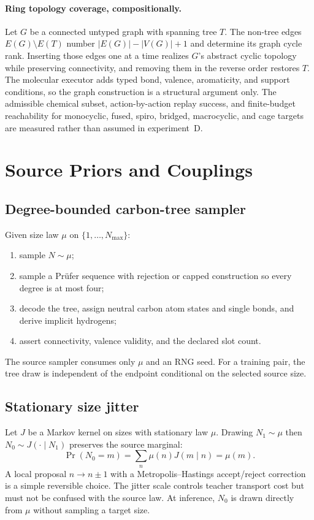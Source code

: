 \documentclass{article}
\theoremstyle{definition}
\theoremstyle{remark}
\begin{document}
\paragraph{Ring topology coverage, compositionally.}
Let $G$ be a connected untyped graph with spanning tree $T$. The non-tree edges $E(G)\setminus E(T)$ number $|E(G)|-|V(G)|+1$ and determine its graph cycle rank. Inserting those edges one at a time realizes $G$'s abstract cyclic topology while preserving connectivity, and removing them in the reverse order restores $T$. The molecular executor adds typed bond, valence, aromaticity, and support conditions, so the graph construction is a structural argument only. The admissible chemical subset, action-by-action replay success, and finite-budget reachability for monocyclic, fused, spiro, bridged, macrocyclic, and cage targets are measured rather than assumed in experiment~D.

\section{Source Priors and Couplings}\label{app:prior}

\subsection{Degree-bounded carbon-tree sampler}

Given size law $\mu$ on $\{1,\ldots,N_{\max}\}$:
\begin{enumerate}[leftmargin=*]
    \item sample $N\sim\mu$;
    \item sample a Pr\"ufer sequence with rejection or capped construction so every degree is at most four;
    \item decode the tree, assign neutral carbon atom states and single bonds, and derive implicit hydrogens;
    \item assert connectivity, valence validity, and the declared slot count.
\end{enumerate}
The source sampler consumes only $\mu$ and an RNG seed. For a training pair, the tree draw is independent of the endpoint conditional on the selected source size.

\subsection{Stationary size jitter}

Let $J$ be a Markov kernel on sizes with stationary law $\mu$. Drawing $N_1\sim\mu$ then $N_0\sim J(\cdot\mid N_1)$ preserves the source marginal:
\begin{equation}
\Pr(N_0=m)=\sum_n\mu(n)J(m\mid n)=\mu(m).
\end{equation}
A local proposal $n\to n\pm1$ with a Metropolis--Hastings accept/reject correction is a simple reversible choice. The jitter scale controls teacher transport cost but must not be confused with the source law. At inference, $N_0$ is drawn directly from $\mu$ without sampling a target size.
\end{document}
